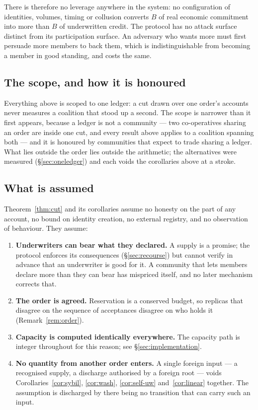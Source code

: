 There is therefore no leverage anywhere in the system: no configuration of identities,
volumes, timing or collusion converts $B$ of real economic commitment into more than $B$
of underwritten credit. The protocol has no attack surface distinct from its participation
surface. An adversary who wants more must first persuade more members to back them, which
is indistinguishable from becoming a member in good standing, and costs the same.

\subsection{The scope, and how it is honoured}

Everything above is scoped to one ledger: a cut drawn over one order's accounts never
measures a coalition that stood up a second. The scope is narrower than it first appears,
because a ledger is not a community --- two co-operatives sharing an order are inside one
cut, and every result above applies to a coalition spanning both --- and it is honoured by
communities that expect to trade sharing a ledger. What lies outside the order lies outside
the arithmetic; the alternatives were measured (\S\ref{sec:oneledger}) and each voids the
corollaries above at a stroke.

\subsection{What is assumed}

Theorem~\ref{thm:cut} and its corollaries assume no honesty on the part of any account, no
bound on identity creation, no external registry, and no observation of behaviour. They
assume:

\begin{enumerate}[leftmargin=1.6em]
  \item \textbf{Underwriters can bear what they declared.} A supply is a promise; the
        protocol enforces its consequences (\S\ref{sec:recourse}) but cannot verify in
        advance that an underwriter is good for it. A community that lets members declare
        more than they can bear has mispriced itself, and no later mechanism corrects
        that.
  \item \textbf{The order is agreed.} Reservation is a conserved budget, so replicas that
        disagree on the sequence of acceptances disagree on who holds it
        (Remark~\ref{rem:order}).
  \item \textbf{Capacity is computed identically everywhere.} The capacity path is
        integer throughout for this reason; see \S\ref{sec:implementation}.
  \item \textbf{No quantity from another order enters.} A single foreign input --- a
        recognised supply, a discharge authorised by a foreign root --- voids
        Corollaries~\ref{cor:sybil}, \ref{cor:wash}, \ref{cor:self-uw}
        and~\ref{cor:linear} together. The assumption is discharged by there being no
        transition that can carry such an input.
\end{enumerate}

